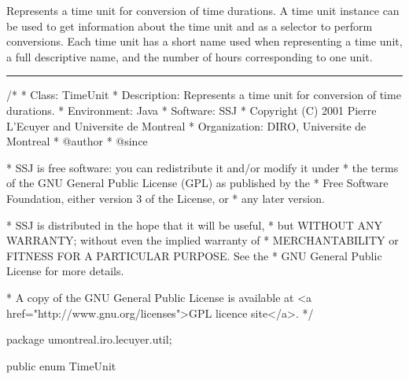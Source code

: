 
Represents a time unit for conversion of time durations.
A time unit instance can be used to get information about
the time unit and as a selector to perform conversions.
Each time unit has a short name used when representing a time unit,
a full descriptive name, and the number of hours corresponding to one unit.

\bigskip\hrule

\begin{code}
\begin{hide}
/*
 * Class:        TimeUnit
 * Description:  Represents a time unit for conversion of time durations.
 * Environment:  Java
 * Software:     SSJ 
 * Copyright (C) 2001  Pierre L'Ecuyer and Universite de Montreal
 * Organization: DIRO, Universite de Montreal
 * @author       
 * @since

 * SSJ is free software: you can redistribute it and/or modify it under
 * the terms of the GNU General Public License (GPL) as published by the
 * Free Software Foundation, either version 3 of the License, or
 * any later version.

 * SSJ is distributed in the hope that it will be useful,
 * but WITHOUT ANY WARRANTY; without even the implied warranty of
 * MERCHANTABILITY or FITNESS FOR A PARTICULAR PURPOSE.  See the
 * GNU General Public License for more details.

 * A copy of the GNU General Public License is available at
   <a href="http://www.gnu.org/licenses">GPL licence site</a>.
 */
\end{hide}
package umontreal.iro.lecuyer.util;


public enum TimeUnit\begin{hide} {
\end{hide}\end{code}
